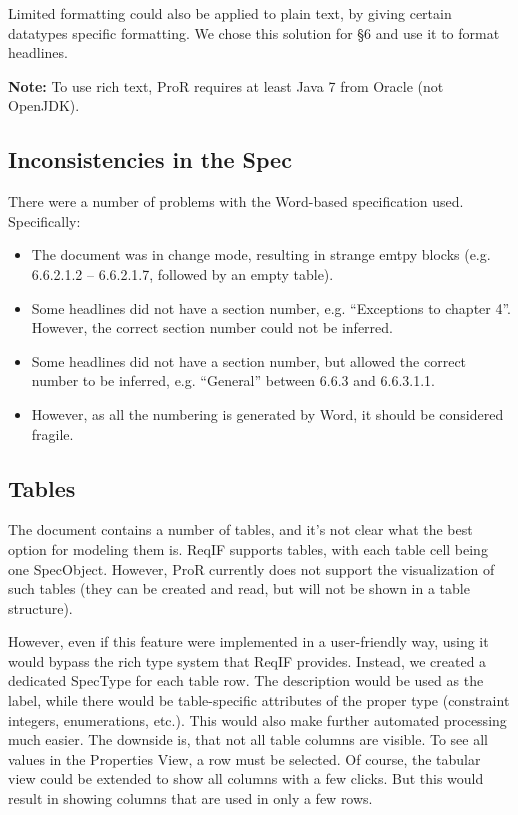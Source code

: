 \documentclass{template/openetcs_report}
\begin{document}
Limited formatting could also be applied to plain text, by giving certain datatypes specific formatting.  We chose this solution for §6 and use it to format headlines.

\textbf{Note:} To use rich text, ProR requires at least Java 7 from Oracle (not OpenJDK).

\subsection{Inconsistencies in the Spec}

There were a number of problems with the Word-based specification used.  Specifically:

\begin{itemize}

\item The document was in change mode, resulting in strange emtpy blocks (e.g. 6.6.2.1.2 -- 6.6.2.1.7, followed by an empty table).

\item Some headlines did not have a section number, e.g. ``Exceptions to chapter 4''.  However, the correct section number could not be inferred.

\item Some headlines did not have a section number, but allowed the correct number to be inferred, e.g. ``General'' between 6.6.3 and 6.6.3.1.1.

\item However, as all the numbering is generated by Word, it should be considered fragile.

\end{itemize}

\subsection{Tables}
\label{sec:tables}

The document contains a number of tables, and it's not clear what the best option for modeling them is.  ReqIF supports tables, with each table cell being one SpecObject.  However, ProR currently does not support the visualization of such tables (they can be created and read, but will not be shown in a table structure).

However, even if this feature were implemented in a user-friendly way, using it would bypass the rich type system that ReqIF provides.  Instead, we created a dedicated SpecType for each table row.  The description would be used as the label, while there would be table-specific attributes of the proper type (constraint integers, enumerations, etc.).  This would also make further automated processing much easier.  The downside is, that not all table columns are visible.  To see all values in the Properties View, a row must be selected.  Of course, the tabular view could be extended to show all columns with a few clicks.  But this would result in showing columns that are used in only a few rows.
\end{document}
